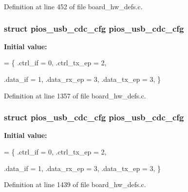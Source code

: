Definition at line 452 of file board\-\_\-hw\-\_\-defs.\-c.

\hypertarget{group___tau_labs_core_ga05cc3e449d417c7f9097d2659e6f5ca3}{
\subsubsection[{pios\-\_\-usb\-\_\-cdc\-\_\-cfg}]{\setlength{\rightskip}{0pt plus 5cm}struct {\bf pios\-\_\-usb\-\_\-cdc\-\_\-cfg} {\bf pios\-\_\-usb\-\_\-cdc\-\_\-cfg}}}\label{group___tau_labs_core_ga05cc3e449d417c7f9097d2659e6f5ca3}
{\bfseries Initial value\-:}
\begin{DoxyCode}
= \{
        .ctrl\_if = 0,
        .ctrl\_tx\_ep = 2,

        .data\_if = 1,
        .data\_rx\_ep = 3,
        .data\_tx\_ep = 3,
\}
\end{DoxyCode}


Definition at line 1357 of file board\-\_\-hw\-\_\-defs.\-c.

\hypertarget{group___tau_labs_core_ga05cc3e449d417c7f9097d2659e6f5ca3}{
\subsubsection[{pios\-\_\-usb\-\_\-cdc\-\_\-cfg}]{\setlength{\rightskip}{0pt plus 5cm}struct {\bf pios\-\_\-usb\-\_\-cdc\-\_\-cfg} {\bf pios\-\_\-usb\-\_\-cdc\-\_\-cfg}}}\label{group___tau_labs_core_ga05cc3e449d417c7f9097d2659e6f5ca3}
{\bfseries Initial value\-:}
\begin{DoxyCode}
= \{
        .ctrl\_if = 0,
        .ctrl\_tx\_ep = 2,

        .data\_if = 1,
        .data\_rx\_ep = 3,
        .data\_tx\_ep = 3,
\}
\end{DoxyCode}


Definition at line 1439 of file board\-\_\-hw\-\_\-defs.\-c.


